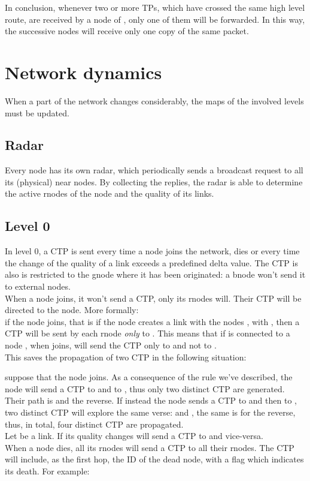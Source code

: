 \documentclass[a4paper]{article}
\begin{document}
In conclusion, whenever two or more TPs, which have crossed the same high level
route, are received by a node of , only one of them will be forwarded. In
this way, the successive nodes will receive only one copy of the same packet.

\section{Network dynamics}
When a part of the network changes considerably, the maps of the involved
levels must be updated.

\subsection{Radar}
Every node has its own radar, which periodically sends a broadcast request to
all its (physical) near nodes. By collecting the replies, the radar is able to
determine the active rnodes of the node and the quality of its links.

\subsection{Level 0}
\label{sec:netdyn-level0}
In level 0, a CTP is sent every time a node joins the network, dies or every
time the change of the quality of a link exceeds a predefined delta value. The
CTP is also is restricted to the gnode where it has been originated: a
bnode won't send it to external nodes.\\
\newline
When a node joins, it won't send a CTP, only its rnodes will.
Their CTP will be directed to the node. More formally:\\
if the node  joins, that is if the node  creates a link
with the nodes , with , then a CTP will
be sent by each rnode  \emph{only} to . This means that if  is connected to a node , when
 joins,  will send the CTP only to  and not to
.\\
This saves the propagation of two CTP in the following situation:

suppose that the node  joins. As a consequence of the rule we've described,
the node  will send a CTP to  and  to , thus only two distinct CTP are
generated. Their path is  and
the reverse. If instead the node  sends a CTP to  and then  to ,
two distinct CTP will explore the same verse:  and , the
same is for the reverse, thus, in total, four distinct CTP are propagated.\\
\newline
Let  be a link. If its quality changes 
will send a CTP to  and vice-versa.\\
\newline
When a node dies, all its rnodes will send a CTP to all their rnodes. The CTP
will include, as the first hop, the ID of the dead node, with a flag which
indicates its death. For example:
\end{document}
